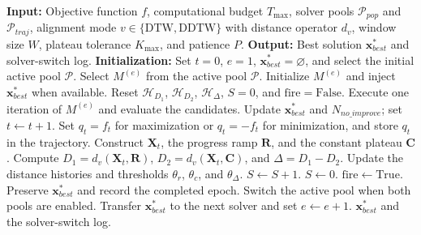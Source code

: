 \documentclass[review]{elsarticle}
\begin{document}
\begin{algorithm}[H]
\caption{DTW/DDTW orchestrator for adaptive metaheuristic switching}
\label{alg:orchestrator_workflow}
\begin{algorithmic}[1]
\STATE \textbf{Input:} Objective function $f$, computational budget
$T_{\max}$, solver pools $\mathcal{P}_{pop}$ and $\mathcal{P}_{traj}$,
alignment mode $v\in\{\mathrm{DTW},\mathrm{DDTW}\}$ with distance operator
$d_v$, window size $W$, plateau tolerance $K_{\max}$, and patience $P$.
\STATE \textbf{Output:} Best solution $\mathbf{x}_{best}^{*}$ and solver-switch log.
\STATE \textbf{Initialization:} Set $t=0$, $e=1$,
$\mathbf{x}_{best}^{*}=\varnothing$, and select the initial active pool
$\mathcal{P}$.
    \STATE Select $M^{(e)}$ from the active pool $\mathcal{P}$.
    \STATE Initialize $M^{(e)}$ and inject $\mathbf{x}_{best}^{*}$ when available.
    \STATE Reset $\mathcal{H}_{D_1}$, $\mathcal{H}_{D_2}$,
    $\mathcal{H}_{\Delta}$, $S=0$, and $\mathrm{fire}=\mathrm{False}$.
        \STATE Execute one iteration of $M^{(e)}$ and evaluate the candidates.
        \STATE Update $\mathbf{x}_{best}^{*}$ and
        $N_{no\_improve}$; set $t\gets t+1$.
        \STATE Set $q_t=f_t$ for maximization or $q_t=-f_t$ for minimization,
        and store $q_t$ in the trajectory.
            \STATE Construct $\mathbf{X}_t$, the progress ramp $\mathbf{R}$,
            and the constant plateau $\mathbf{C}$.
            \STATE Compute $D_1=d_v(\mathbf{X}_t,\mathbf{R})$,
            $D_2=d_v(\mathbf{X}_t,\mathbf{C})$, and
            $\Delta=D_1-D_2$.
            \STATE Update the distance histories and thresholds
            $\theta_r$, $\theta_c$, and $\theta_{\Delta}$.
                \STATE $S\gets S+1$.
            \ELSE
                \STATE $S\gets0$.
            \ENDIF
                \STATE $\mathrm{fire}\gets\mathrm{True}$.
            \ENDIF
        \ENDIF
    \ENDWHILE
    \STATE Preserve $\mathbf{x}_{best}^{*}$ and record the completed epoch.
        \STATE Switch the active pool when both pools are enabled.
        \STATE Transfer $\mathbf{x}_{best}^{*}$ to the next solver and
        set $e\gets e+1$.
    \ENDIF
\ENDWHILE
\RETURN $\mathbf{x}_{best}^{*}$ and the solver-switch log.
\end{algorithmic}
\end{algorithm}
\end{document}
